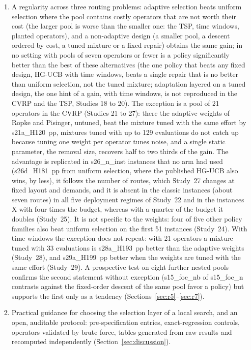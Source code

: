 \begin{enumerate}
\item A regularity across three routing problems: adaptive selection beats uniform selection where the pool contains costly operators that are not worth their cost (the larger pool is worse than the smaller one: the TSP, time windows, planted operators), and a non-adaptive design (a smaller pool, a descent ordered by cost, a tuned mixture or a fixed repair) obtains the same gain; in no setting with pools of seven operators or fewer is a policy significantly better than the best of these alternatives (the one policy that beats any fixed design, HG-UCB with time windows, beats a single repair that is no better than uniform selection, not the tuned mixture; adaptation layered on a tuned design, the one hint of a gain, with time windows, is not reproduced in the CVRP and the TSP, Studies 18 to 20). The exception is a pool of 21 operators in the CVRP (Studies 21 to 27): there the adaptive weights of Ropke and Pisinger, untuned, beat the mixture tuned with the same effort by \num{s21a_H120}~pp, mixtures tuned with up to 129 evaluations do not catch up because tuning one weight per operator tunes noise, and a single static parameter, the removal size, recovers half to two thirds of the gain. The advantage is replicated in \num{s26_n_inst} instances that no arm had used (\num{s26d_H181}~pp from uniform selection, where the published HG-UCB also wins, by less), it follows the number of routes, which Study~27 changes at fixed layout and demands, and it is absent in the classic instances (about seven routes) in all five deployment regimes of Study~22 and in the instances X with four times the budget, whereas with a quarter of the budget it doubles (Study~25). It is not specific to the weights: four of five other policy families also beat uniform selection on the first 51 instances (Study~24). With time windows the exception does not repeat: with 21 operators a mixture tuned with 33 evaluations is \num{s28a_H193}~pp better than the adaptive weights (Study~28), and \num{s29a_H199}~pp better when the weights are tuned with the same effort (Study~29). A prospective test on eight further nested pools confirms the second statement without exception (\num{s15_foc_nb} of \num{s15_foc_n} contrasts against the fixed-order descent of the same pool favor a policy) but supports the first only as a tendency (Sections~\ref{sec:r5}--\ref{sec:r7}).
\item Practical guidance for choosing the selection layer of a local search, and an open, auditable protocol: pre-specification entries, exact-regression controls, operators validated by brute force, tables generated from raw results and recomputed independently (Section~\ref{sec:discussion}).
\end{enumerate}

